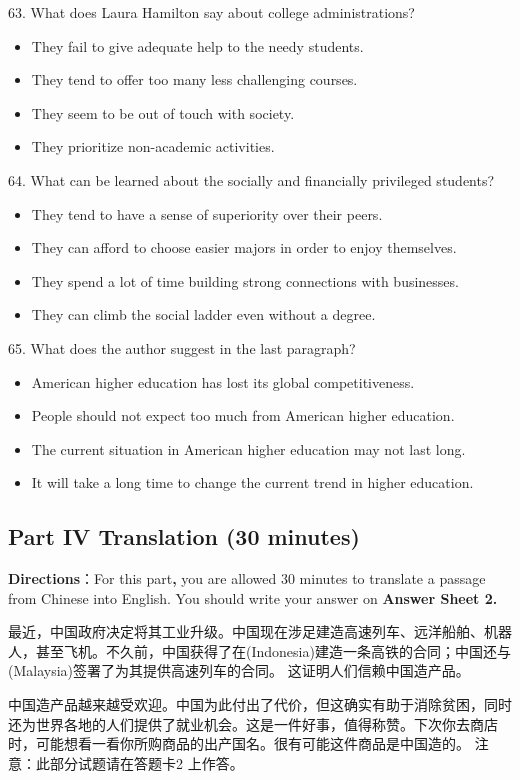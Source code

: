 \documentclass[UTF8,11pt]{ctexart}
\begin{document}
63. What does Laura Hamilton say about college administrations?


\begin{itemize}[leftmargin=2em,itemsep=.2em,topsep=.4em]\item[A.] They fail to give adequate help to the needy students.
\item[B.] They tend to offer too many less challenging courses.
\item[C.] They seem to be out of touch with society.
\item[D.] They prioritize non-academic activities.
\end{itemize}

64. What can be learned about the socially and financially privileged students?


\begin{itemize}[leftmargin=2em,itemsep=.2em,topsep=.4em]\item[A.] They tend to have a sense of superiority over their peers.
\item[B.] They can afford to choose easier majors in order to enjoy themselves.
\item[C.] They spend a lot of time building strong connections with businesses.
\item[D.] They can climb the social ladder even without a degree.
\end{itemize}

65. What does the author suggest in the last paragraph?


\begin{itemize}[leftmargin=2em,itemsep=.2em,topsep=.4em]\item[A.] American higher education has lost its global competitiveness.
\item[B.] People should not expect too much from American higher education.
\item[C.] The current situation in American higher education may not last long.
\item[D.] It will take a long time to change the current trend in higher education.
\end{itemize}

\subsection*{\textbf{Part} IV \textbf{Translation} \textbf{(30 minutes)}}


\textbf{Directions}：For this part\textbf{,} you are allowed 30 minutes to translate a passage from Chinese into English. You should write your answer on\textbf{ Answer Sheet 2.}


最近，中国政府决定将其工业升级。中国现在涉足建造高速列车、远洋船舶、机器人，甚至飞机。不久前，中国获得了在(Indonesia)建造一条高铁的合同；中国还与(Malaysia)签署了为其提供高速列车的合同。 这证明人们信赖中国造产品。


中国造产品越来越受欢迎。中国为此付出了代价，但这确实有助于消除贫困，同时还为世界各地的人们提供了就业机会。这是一件好事，值得称赞。下次你去商店时，可能想看一看你所购商品的出产国名。很有可能这件商品是中国造的。 注意：此部分试题请在答题卡2 上作答。
\end{document}
